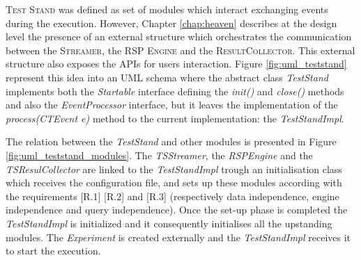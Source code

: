 \noindent \name \textsc{Test Stand} was defined as set of modules which interact exchanging events during the execution. However, Chapter \ref{chap:heaven} describes at the design level the presence of an external structure which orchestrates the communication between the \textsc{Streamer}, the \textsc{RSP Engine} and the \textsc{ResultCollector}. This external structure also exposes the APIs for users interaction. Figure \ref{fig:uml_teststand} represent this idea into an UML schema where the abstract class \textit{TestStand} implements both the \textit{Startable} interface  defining the \textit{init()} and \textit{close()} methods and also the \textit{EventProcessor} interface, but it leaves the implementation of the \textit{process(CTEvent e)} method to the current implementation: the \textit{TestStandImpl}. 

The relation between the \textit{TestStand} and other modules is presented in Figure \ref{fig:uml_teststand_modules}. The \textit{TSStreamer}, the \textit{RSPEngine} and the \textit{TSResulCollector} are linked to the \textit{TestStandImpl} trough an initialisation class which receives the configuration file, and sets up these modules according with the requirements [R.1]  [R.2] and [R.3] (respectively data independence, engine independence and query independence). Once the set-up phase is completed the \textit{TestStandImpl} is initialized and it consequently initialises all the upstanding modules. The \textit{Experiment} is created externally and  the \textit{TestStandImpl} receives it to start the execution. 


